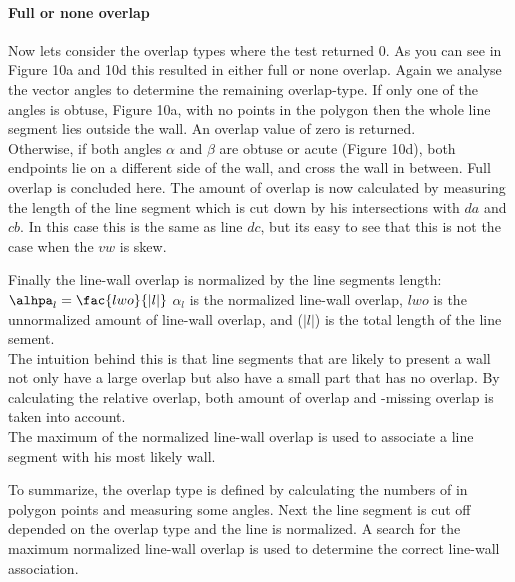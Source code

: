 \documentclass[10pt]{article}
\begin{document}
	\paragraph{Full or none overlap}
	Now lets consider the overlap types where the  test
	returned 0.
	As you can see in Figure 10a and 10d this resulted in either full or none overlap.
	Again we analyse the vector angles to determine the remaining overlap-type.
	If only one of the angles is obtuse, Figure 10a, with no points in the polygon 
	then the whole line segment lies outside the wall. An overlap value of zero
	is returned.\\
	Otherwise, if both angles $\alpha$ and $\beta$ are obtuse or acute (Figure 10d),
	both endpoints lie on a different side of the wall, and cross the wall in
	between. Full overlap is concluded here. 
	The amount of overlap is now calculated by measuring the length
	of the line segment which is cut down by his intersections with $da$ and
	$cb$. In this case this is the same as line $dc$, but its easy to see that
	this is not the case when the $vw$ is skew.





	
	Finally the line-wall overlap is normalized by the line segments length:\\
	$\alhpa_{l} = \fac{lwo}{|l|}$
	$\alpha_{l}$ is the normalized line-wall overlap, 
	$lwo$ is the unnormalized amount of line-wall overlap, 
	and ($|l|$) is the total length of the line sement.\\

	The intuition behind this is that line segments that are likely to
	present a wall not only have a large overlap but also have a small part
	that has no overlap. By calculating the relative overlap, both amount of overlap
	and -missing overlap is taken into account.\\

	The maximum of the normalized line-wall overlap is used to associate a
	line segment with his most likely wall.

	To summarize, the overlap type is defined by calculating the numbers of in
	polygon points and measuring some angles. Next the line segment is cut off
	depended on the overlap type and the line is normalized. A search for the
	maximum normalized line-wall overlap is used to determine the correct line-wall
	association.
\end{document}
